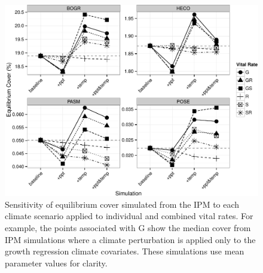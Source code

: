 \documentclass[12pt,]{article}
\begin{document}
\begin{figure}[htbp]
\centering
\includegraphics{components/figure/manuscript-figure_3.pdf}
\caption{Sensitivity of equilibrium cover simulated from the IPM to each
climate scenario applied to individual and combined vital rates. For
example, the points associated with G show the median cover from IPM
simulations where a climate perturbation is applied only to the growth
regression climate covariates. These simulations use mean parameter
values for clarity.}
\end{figure}
\end{document}
